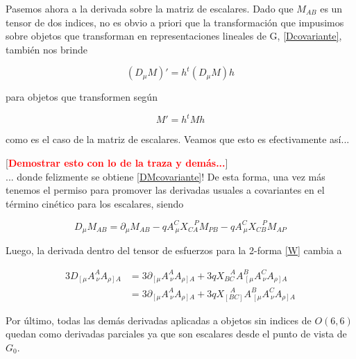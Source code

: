 \documentclass{article}
\numberwithin{equation}{section}
\begin{document}
Pasemos ahora a la derivada sobre la matriz de escalares. Dado que $ M_{A B} $ es un tensor de dos indices, no es obvio a priori que la transformación que impusimos sobre objetos que transforman en representaciones lineales de G, \ref{Dcovariante}, también nos brinde

\begin{equation}\label{DMcovariante}
\left(D_{\mu} M\right)' = h^{t} \left(D_{\mu} M\right) h 
\end{equation}

para objetos que transformen según

\begin{equation}
M' = h^{t} M h
\end{equation}

como es el caso de la matriz de escalares. Veamos que esto es efectivamente así...

[\textcolor{red}{\textbf{Demostrar esto con lo de la traza y demás...}}]\\

... donde felizmente se obtiene \ref{DMcovariante}! De esta forma, una vez más tenemos el permiso para promover las derivadas usuales a covariantes en el término cinético para los escalares, siendo


\begin{boxquation}
\begin{equation}
D_{\mu} M_{A B} = \partial_{\mu}  M_{A B} -q A^C_{\ \mu} X_{C A}^{\ \ \ \ P} M_{P B} - q A^C_{\ \mu} X_{C B}^{\ \ \ \ P} M_{A P}
\end{equation}
\end{boxquation}

Luego, la derivada dentro del tensor de esfuerzos para la 2-forma \ref{W} cambia a

\begin{equation}
\begin{aligned}
3D_{\left[\mu\right.}A^A_{\ \nu}A_{\left.\rho\right] A} &= 3 \partial_{\left[\mu\right.}A^A_{\ \nu}A_{\left.\rho\right] A} + 3q X_{B C}^{\ \ \ \ A} A^B_{\ \left[\mu\right.}A^C_{\ \nu}A_{\left.\rho\right] A}\\
&= 3 \partial_{\left[\mu\right.}A^A_{\ \nu}A_{\left.\rho\right] A} + 3q X_{\left[B C\right]}^{\ \ \ \ A} A^B_{\ \left[\mu\right.}A^C_{\ \nu}A_{\left.\rho\right] A}
\end{aligned}
\end{equation}

Por último, todas las demás derivadas aplicadas a objetos sin indices de $ O(6,6) $ quedan como derivadas parciales ya que son escalares desde el punto de vista de $ G_0 $.
\end{document}
